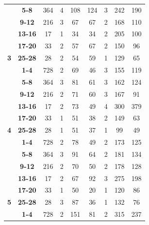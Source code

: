 \begin{table}
{\begin{tabular}{|c@{~}|c@{~}|c@{~}|c@{~}|c@{~}|c@{~}|c@{~}|c@{~}|c|}
 & \textbf{5-8} & 364 & 4 & 108 & 124 & 3 & 242 & 190 \\ \cline{2-9} 
 & \textbf{9-12} & 216 & 3 & 67 & 67 & \cellcolor[HTML]{EFEFEF}2 & 168 & 110 \\ \cline{2-9} 
 & \textbf{13-16} & 17 & \cellcolor[HTML]{C0C0C0}1 & 34 & 34 & \cellcolor[HTML]{EFEFEF}2 & 205 & 100 \\ \cline{2-9} 
 & \textbf{17-20} & 33 & \cellcolor[HTML]{EFEFEF}2 & 57 & 67 & \cellcolor[HTML]{EFEFEF}2 & 150 & 96 \\ \cline{2-9} 
\multirow{-6}{*}{\textbf{3}} & \textbf{25-28} & 28 & \cellcolor[HTML]{EFEFEF}2 & 54 & 59 & \cellcolor[HTML]{C0C0C0}1 & 129 & 65 \\ \hline
 & \textbf{1-4} & 728 & \cellcolor[HTML]{EFEFEF}2 & 69 & 46 & 3 & 155 & 119 \\ \cline{2-9} 
 & \textbf{5-8} & 364 & 3 & 81 & 61 & 3 & 162 & 124 \\ \cline{2-9} 
 & \textbf{9-12} & 216 & \cellcolor[HTML]{EFEFEF}2 & 71 & 60 & 3 & 167 & 91 \\ \cline{2-9} 
 & \textbf{13-16} & 17 & \cellcolor[HTML]{EFEFEF}2 & 73 & 49 & 4 & 300 & 379 \\ \cline{2-9} 
 & \textbf{17-20} & 33 & \cellcolor[HTML]{C0C0C0}1 & 51 & 38 & \cellcolor[HTML]{EFEFEF}2 & 149 & 63 \\ \cline{2-9} 
\multirow{-6}{*}{\textbf{4}} & \textbf{25-28} & 28 & \cellcolor[HTML]{C0C0C0}1 & 51 & 37 & \cellcolor[HTML]{C0C0C0}1 & 99 & 49 \\ \hline
 & \textbf{1-4} & 728 & \cellcolor[HTML]{EFEFEF}2 & 78 & 49 & \cellcolor[HTML]{EFEFEF}2 & 173 & 125 \\ \cline{2-9} 
 & \textbf{5-8} & 364 & 3 & 91 & 64 & \cellcolor[HTML]{EFEFEF}2 & 181 & 134 \\ \cline{2-9} 
 & \textbf{9-12} & 216 & \cellcolor[HTML]{EFEFEF}2 & 70 & 50 & \cellcolor[HTML]{EFEFEF}2 & 178 & 128 \\ \cline{2-9} 
 & \textbf{13-16} & 17 & \cellcolor[HTML]{EFEFEF}2 & 67 & 92 & 3 & 275 & 198 \\ \cline{2-9} 
 & \textbf{17-20} & 33 & \cellcolor[HTML]{C0C0C0}1 & 50 & 20 & \cellcolor[HTML]{C0C0C0}1 & 120 & 86 \\ \cline{2-9} 
\multirow{-6}{*}{\textbf{5}} & \textbf{25-28} & 28 & 3 & 87 & 36 & \cellcolor[HTML]{C0C0C0}1 & 132 & 76 \\ \hline
 & \textbf{1-4} & 728 & \cellcolor[HTML]{EFEFEF}2 & 151 & 81 & \cellcolor[HTML]{EFEFEF}2 & 315 & 237 \\ \cline{2-9} 

\end{tabular}}
\end{table}
